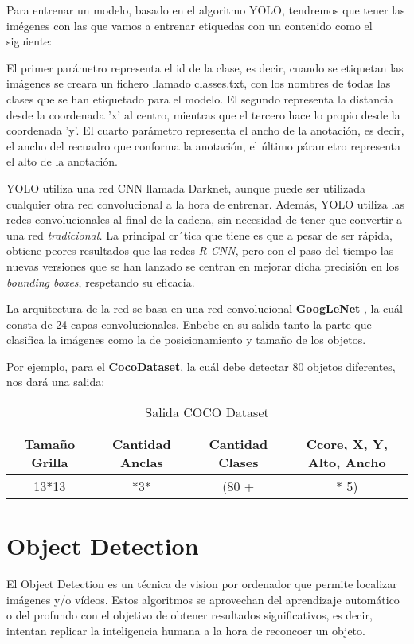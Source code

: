 
Para entrenar un modelo, basado en el algoritmo YOLO, tendremos que tener las imégenes con las que vamos a entrenar etiquedas con un contenido como el siguiente:


El primer parámetro representa el id de la clase, es decir, cuando se etiquetan las imágenes se creara un fichero llamado classes.txt, con los nombres de todas las clases que se han etiquetado para el modelo.
El segundo representa la distancia desde la coordenada 'x' al centro, mientras que el tercero hace lo propio desde la coordenada 'y'.
El cuarto parámetro representa el ancho de la anotación, es decir, el ancho del recuadro que conforma la anotación, el último párametro representa el alto de la anotación.

YOLO utiliza una red CNN llamada Darknet, aunque puede ser utilizada cualquier otra red convolucional a la hora de entrenar. Además, YOLO utiliza las redes convolucionales al final de la cadena, sin necesidad de tener que convertir a una red \textit{tradicional.}
La principal cr´tica que tiene es que a pesar de ser rápida, obtiene peores resultados que las redes \textit{R-CNN}, pero con el paso del tiempo las nuevas versiones que se han lanzado se centran en mejorar dicha precisión en los \textit{bounding boxes}, respetando su eficacia.

La arquitectura de la red se basa en una red convolucional \textbf{GoogLeNet} \cite{googlenet}, la cuál consta de 24 capas convolucionales. Enbebe en su salida tanto la parte que clasifica la imágenes como la de posicionamiento y tamaño de los objetos.


Por ejemplo, para el \textbf{CocoDataset}, la cuál debe detectar 80 objetos diferentes, nos dará una salida:

\begin{table}[h!]
    \centering
    \begin{tabular}{| c | c | c | c |}
        \hline
        Tamaño Grilla & Cantidad Anclas & Cantidad Clases & Ccore, X, Y, Alto, Ancho \\ \hline
        13*13 & *3* & (80 + & * 5) \\ \hline
    \end{tabular}
    \caption{Salida COCO Dataset}
    \label{tab:salidaYOLO}
\end{table}

\clearpage

\section{Object Detection}

El Object Detection \cite{objectDetect} es un técnica de vision por ordenador que permite localizar imágenes y/o vídeos. Estos algoritmos se aprovechan del aprendizaje automático o del profundo 
con el objetivo de obtener resultados significativos, es decir, intentan replicar la inteligencia humana a la hora de reconcoer un objeto.

